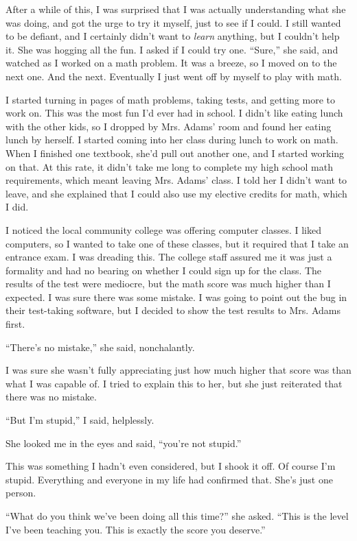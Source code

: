 After a while of this, I was surprised that I was actually understanding what she was doing, and got the urge to try it myself, just to see if I could. I still wanted to be defiant, and I certainly didn't want to \emph{learn} anything, but I couldn't help it. She was hogging all the fun. I asked if I could try one. ``Sure,'' she said, and watched as I worked on a math problem. It was a breeze, so I moved on to the next one. And the next. Eventually I just went off by myself to play with math.

I started turning in pages of math problems, taking tests, and getting more to work on. This was the most fun I'd ever had in school. I didn't like eating lunch with the other kids, so I dropped by Mrs. Adams' room and found her eating lunch by herself. I started coming into her class during lunch to work on math. When I finished one textbook, she'd pull out another one, and I started working on that. At this rate, it didn't take me long to complete my high school math requirements, which meant leaving Mrs. Adams' class. I told her I didn't want to leave, and she explained that I could also use my elective credits for math, which I did. 

I noticed the local community college was offering computer classes. I liked computers, so I wanted to take one of these classes, but it required that I take an entrance exam. I was dreading this. The college staff assured me it was just a formality and had no bearing on whether I could sign up for the class. The results of the test were mediocre, but the math score was much higher than I expected. I was sure there was some mistake. I was going to point out the bug in their test-taking software, but I decided to show the test results to Mrs. Adams first.

``There's no mistake,'' she said, nonchalantly.

I was sure she wasn't fully appreciating just how much higher that score was than what I was capable of. I tried to explain this to her, but she just reiterated that there was no mistake.

``But I'm stupid,'' I said, helplessly.

She looked me in the eyes and said, ``you're not stupid.''

This was something I hadn't even considered, but I shook it off. Of course I'm stupid. Everything and everyone in my life had confirmed that. She's just one person.

``What do you think we've been doing all this time?'' she asked. ``This is the level I've been teaching you. This is exactly the score you deserve.''

